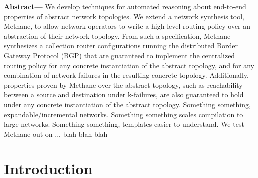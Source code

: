 \documentclass{sig-alternate-10pt}
\newcommand{\sysname}{{\small \sf Methane}\xspace}
\begin{document}
\textbf{Abstract---}
We develop techniques for automated reasoning about end-to-end properties of abstract network topologies. We extend a network synthesis tool, \sysname, to allow network operators to write a high-level routing policy over an abstraction of their network topology. From such a specification, \sysname synthesizes a collection router configurations running the distributed Border Gateway Protocol (BGP) that are guaranteed to implement the centralized routing policy for any concrete instantiation of the abstract topology, and for any combination of network failures in the resulting concrete topology.
%
Additionally, properties proven by \sysname over the abstract topology, such as reachability between a source and destination under k-failures, are also guaranteed to hold under any concrete instantiation of the abstract topology.
%
Something something, expandable/incremental networks. Something something scales compilation to large networks. Something something, templates easier to understand.
%
%
We test \sysname out on ... blah blah blah



%
%
%
%




%
%
%
%


\section{Introduction}
\label{sec:introduction}
\end{document}
